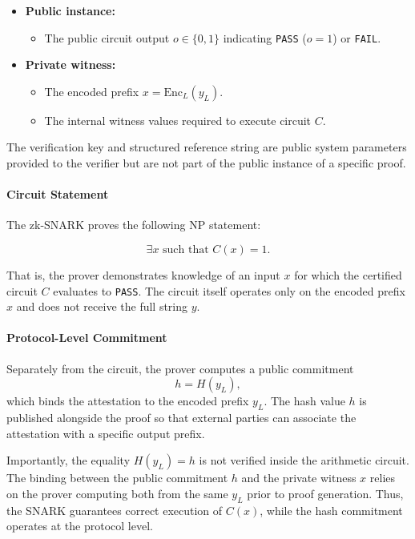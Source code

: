 \documentclass[10pt,conference,a4paper]{IEEEtran}
\begin{document}
\begin{itemize}
    \item \textbf{Public instance:}
    \begin{itemize}
        \item The public circuit output $o \in \{0,1\}$ indicating \texttt{PASS} ($o=1$) or \texttt{FAIL}.
    \end{itemize}
    \item \textbf{Private witness:}
    \begin{itemize}
        \item The encoded prefix $x = \mathrm{Enc}_L(y_L)$.
        \item The internal witness values required to execute circuit $C$.
    \end{itemize}
\end{itemize}

The verification key and structured reference string are public system parameters provided to the verifier but are not part of the public instance of a specific proof.

\paragraph{Circuit Statement}
The zk-SNARK proves the following NP statement:

\[
\exists x \text{ such that } C(x) = 1.
\]

That is, the prover demonstrates knowledge of an input $x$ for which the certified circuit $C$ evaluates to \texttt{PASS}. The circuit itself operates only on the encoded prefix $x$ and does not receive the full string $y$.

\paragraph{Protocol-Level Commitment}
Separately from the circuit, the prover computes a public commitment
\[
h = H(y_L),
\]
which binds the attestation to the encoded prefix $y_L$. The hash value $h$ is published alongside the proof so that external parties can associate the attestation with a specific output prefix.

Importantly, the equality $H(y_L) = h$ is not verified inside the arithmetic circuit. The binding between the public commitment $h$ and the private witness $x$ relies on the prover computing both from the same $y_L$ prior to proof generation. Thus, the SNARK guarantees correct execution of $C(x)$, while the hash commitment operates at the protocol level.
\end{document}
